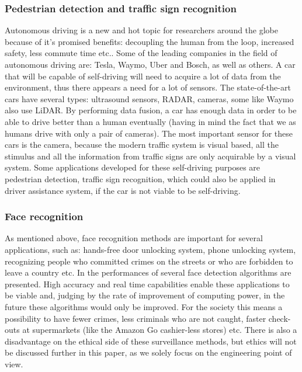 \documentclass[12pt,a4paper,twoside]{report}
\begin{document}
\subsubsection{Pedestrian detection and traffic sign recognition}
Autonomous driving is a new and hot topic for researchers around the globe because of it's promised benefits: decoupling the human from the loop, increased safety, less commute time etc.\cite{article-autonomous1}. Some of the leading companies in the field of autonomous driving are: Tesla, Waymo, Uber and Bosch, as well as others. A car that will be capable of self-driving will need to acquire a lot of data from the environment, thus there appears a need for a lot of sensors. The state-of-the-art cars have several types: ultrasound sensors, RADAR, cameras, some like Waymo also use LiDAR. By performing data fusion, a car has enough data in order to be able to drive better than a human eventually (having in mind the fact that we as humans drive with only a pair of cameras). The most important sensor for these cars is the camera, because the modern traffic system is visual based, all the stimulus and all the information from traffic signs are only acquirable by a visual system. Some applications developed for these self-driving purposes are pedestrian detection\cite{article-peddet}, traffic sign recognition\cite{article-ciresantraffic}\cite{article-trafficsigndet}\cite{article-lecuntraffic}, which could also be applied in driver assistance system, if the car is not viable to be self-driving.\par

\subsubsection{Face recognition}
As mentioned above, face recognition methods are important for several applications, such as: hands-free door unlocking system, phone unlocking system, recognizing people who committed crimes on the streets or who are forbidden to leave a country etc\cite{article-cvapp}. In\cite{article-faceann} the performances of several face detection algorithms are presented. High accuracy and real time capabilities enable these applications to be viable and, judging by the rate of improvement of computing power, in the future these algorithms would only be improved. For the society this means a possibility to have fewer crimes, less criminals who are not caught, faster check-outs at supermarkets (like the Amazon Go cashier-less stores) etc. There is also a disadvantage on the ethical side of these surveillance methods, but ethics will not be discussed further in this paper, as we solely focus on the engineering point of view.\par
\end{document}
